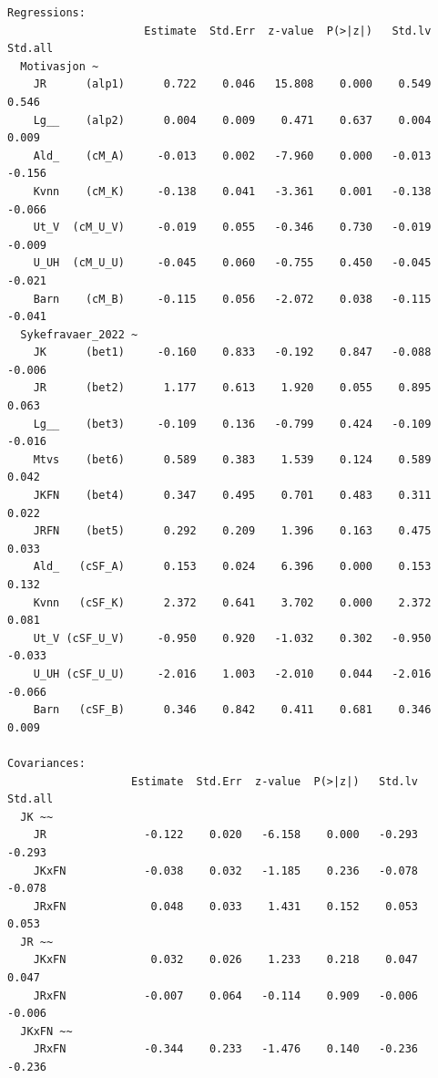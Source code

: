 \documentclass[
  12pt,
  a4paper,
  DIV=11,
  numbers=noendperiod]{scrartcl}
\begin{document}
\begin{verbatim}
Regressions:
                     Estimate  Std.Err  z-value  P(>|z|)   Std.lv  Std.all
  Motivasjon ~                                                            
    JR      (alp1)      0.722    0.046   15.808    0.000    0.549    0.546
    Lg__    (alp2)      0.004    0.009    0.471    0.637    0.004    0.009
    Ald_    (cM_A)     -0.013    0.002   -7.960    0.000   -0.013   -0.156
    Kvnn    (cM_K)     -0.138    0.041   -3.361    0.001   -0.138   -0.066
    Ut_V  (cM_U_V)     -0.019    0.055   -0.346    0.730   -0.019   -0.009
    U_UH  (cM_U_U)     -0.045    0.060   -0.755    0.450   -0.045   -0.021
    Barn    (cM_B)     -0.115    0.056   -2.072    0.038   -0.115   -0.041
  Sykefravaer_2022 ~                                                      
    JK      (bet1)     -0.160    0.833   -0.192    0.847   -0.088   -0.006
    JR      (bet2)      1.177    0.613    1.920    0.055    0.895    0.063
    Lg__    (bet3)     -0.109    0.136   -0.799    0.424   -0.109   -0.016
    Mtvs    (bet6)      0.589    0.383    1.539    0.124    0.589    0.042
    JKFN    (bet4)      0.347    0.495    0.701    0.483    0.311    0.022
    JRFN    (bet5)      0.292    0.209    1.396    0.163    0.475    0.033
    Ald_   (cSF_A)      0.153    0.024    6.396    0.000    0.153    0.132
    Kvnn   (cSF_K)      2.372    0.641    3.702    0.000    2.372    0.081
    Ut_V (cSF_U_V)     -0.950    0.920   -1.032    0.302   -0.950   -0.033
    U_UH (cSF_U_U)     -2.016    1.003   -2.010    0.044   -2.016   -0.066
    Barn   (cSF_B)      0.346    0.842    0.411    0.681    0.346    0.009

Covariances:
                   Estimate  Std.Err  z-value  P(>|z|)   Std.lv  Std.all
  JK ~~                                                                 
    JR               -0.122    0.020   -6.158    0.000   -0.293   -0.293
    JKxFN            -0.038    0.032   -1.185    0.236   -0.078   -0.078
    JRxFN             0.048    0.033    1.431    0.152    0.053    0.053
  JR ~~                                                                 
    JKxFN             0.032    0.026    1.233    0.218    0.047    0.047
    JRxFN            -0.007    0.064   -0.114    0.909   -0.006   -0.006
  JKxFN ~~                                                              
    JRxFN            -0.344    0.233   -1.476    0.140   -0.236   -0.236


\end{verbatim}
\end{document}
